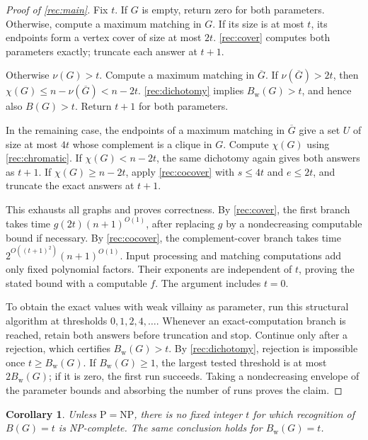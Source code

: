 \documentclass[10pt,a4paper]{amsart}
\numberwithin{equation}{section}
\newtheorem{corollary}[theorem]{Corollary}
\theoremstyle{definition}
\theoremstyle{remark}
\begin{document}
\begin{proof}[Proof of \cref{rec:main}]
Fix $t$. If $G$ is empty, return zero for both parameters.
Otherwise, compute a maximum matching in $G$. If its size is at most
$t$, its endpoints form a vertex cover of size at most $2t$.
\cref{rec:cover} computes both parameters exactly;
truncate each answer at $t+1$.

Otherwise $\nu(G)>t$. Compute a maximum matching in $\overline G$.
If $\nu(\overline G)>2t$, then
$\chi(G)\leq n-\nu(\overline G)<n-2t$.
\cref{rec:dichotomy} implies $B_{\mathrm w}(G)>t$, and hence also
$B(G)>t$. Return $t+1$ for both parameters.

In the remaining case, the endpoints of a maximum matching in
$\overline G$ give a set $U$ of size at most $4t$ whose complement
is a clique in $G$. Compute $\chi(G)$ using
\cref{rec:chromatic}. If $\chi(G)<n-2t$, the same dichotomy
again gives both answers as $t+1$. If $\chi(G)\geq n-2t$, apply
\cref{rec:cocover} with $s\leq4t$ and $e\leq2t$, and
truncate the exact answers at $t+1$.

This exhausts all graphs and proves correctness. By \cref{rec:cover},
the first branch takes time $g(2t)(n+1)^{O(1)}$, after replacing
$g$ by a nondecreasing computable bound if necessary.
By \cref{rec:cocover}, the complement-cover branch takes time
$2^{O((t+1)^2)}(n+1)^{O(1)}$. Input processing and matching
computations add only fixed polynomial factors. Their exponents
are independent of $t$, proving the stated bound with a computable
$f$. The argument includes $t=0$.

To obtain the exact values with weak villainy as parameter, run this
structural algorithm at
thresholds $0,1,2,4,\ldots$. Whenever an exact-computation branch
is reached, retain both answers before truncation and stop.
Continue only after a rejection, which certifies
$B_{\mathrm w}(G)>t$. By \cref{rec:dichotomy}, rejection is
impossible once $t\ge B_{\mathrm w}(G)$.
If $B_{\mathrm w}(G)\ge1$, the largest tested threshold is at most
$2B_{\mathrm w}(G)$; if it is zero, the first run succeeds.
Taking a nondecreasing envelope of the parameter bounds and
absorbing the number of runs proves the claim.
\end{proof}


\begin{corollary}\label{rec:fixed-complexity}
Unless $\mathrm P=\mathrm{NP}$, there is no fixed integer $t$ for
which recognition of $B(G)=t$ is NP-complete. The same conclusion
holds for $B_{\mathrm w}(G)=t$.
\end{corollary}
\end{document}
